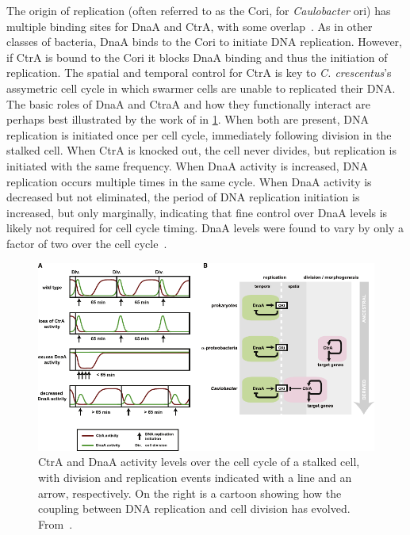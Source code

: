 The origin of replication (often referred to as the Cori, for \textit{Caulobacter} ori) has multiple binding sites for DnaA and CtrA, with some overlap~\cite{frandi2019}.
As in other classes of bacteria, DnaA binds to the Cori to initiate DNA replication.
However, if CtrA is bound to the Cori it blocks DnaA binding and thus the initiation of replication.
The spatial and temporal control for CtrA is key to \textit{C. crescentus}'s assymetric cell cycle in which swarmer cells are unable to replicated their DNA.
The basic roles of DnaA and CtraA and how they functionally interact are perhaps best illustrated by the work of \textcite{jonas2011} in \cref{fig:ctra-dnaa}.
When both are present, DNA replication is initiated once per cell cycle, immediately following division in the stalked cell.
When CtrA is knocked out, the cell never divides, but replication is initiated with the same frequency.
When DnaA activity is increased, DNA replication occurs multiple times in the same cycle.
When DnaA activity is decreased but not eliminated, the period of DNA replication initiation is increased, but only marginally, indicating that fine control over DnaA levels is likely not required for cell cycle timing.
DnaA levels were found to vary by only a factor of two over the cell cycle~\cite{felletti2019}.

\begin{figure}
    \centering
    \includegraphics{ctra-dnaa}
    \caption{
        CtrA and DnaA activity levels over the cell cycle of a stalked cell, with division and replication events indicated with a line and an arrow, respectively.
        On the right is a cartoon showing how the coupling between DNA replication and cell division has evolved.
        From~\cite{jonas2011}.
        \label{fig:ctra-dnaa}
     }
\end{figure}

